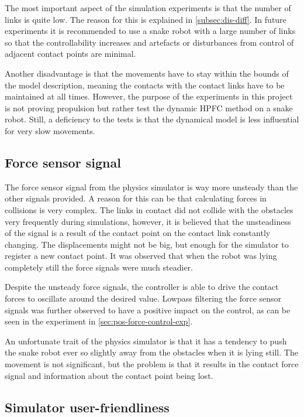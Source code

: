 The most important aspect of the simulation experiments is that the number of links is quite low. The reason for this is explained in \ref{subsec:dis-diff}. In future experiments it is recommended to use a snake robot with a large number of links so that the controllability increases and artefacts or disturbances from control of adjacent contact points are minimal.

Another disadvantage is that the movements have to stay within the bounds of the model description, meaning the contacts with the contact links have to be maintained at all times. However, the purpose of the experiments in this project is not proving propulsion but rather test the dynamic HPFC method on a snake robot. Still, a deficiency to the tests is that the dynamical model is less influential for very slow movements.

\subsection{Force sensor signal}

The force sensor signal from the physics simulator is way more unsteady than the other signals provided. A reason for this can be that calculating forces in collisions is very complex. The links in contact did not collide with the obstacles very frequently during simulations, however, it is believed that the unsteadiness of the signal is a result of the contact point on the contact link constantly changing. The displacements might not be big, but enough for the simulator to register a new contact point. It was observed that when the robot was lying completely still the force signals were much steadier.

Despite the unsteady force signals, the controller is able to drive the contact forces to oscillate around the desired value. Lowpass filtering the force sensor signals was further observed to have a positive impact on the control, as can be seen in the experiment in \ref{sec:pos-force-control-exp}.

An unfortunate trait of the physics simulator is that it has a tendency to push the snake robot ever so slightly away from the obstacles when it is lying still. The movement is not significant, but the problem is that it results in the contact force signal and information about the contact point being lost.

\subsection{Simulator user-friendliness}

